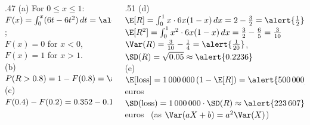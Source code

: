 \begin{slides}
	\small
	\exstatement
	\pause
	\begin{columns}[T]
		\begin{column}{.47\textwidth}
			\sol (a) For $0\le x\le1$:\\
			$F(x)=\int_0^x(6t-6t^2)\,dt=\alert{3x^2-2x^3}$;\\
			$F(x)=0$ for $x<0$, \ $F(x)=1$ for $x>1$.\\[1mm]
			\pause
			(b) $P(R>0.8)=1-F(0.8)=\alert{0.104}$\\[1mm]
			(c) $F(0.4)-F(0.2)=0.352-0.104=\alert{0.248}$
		\end{column}
		\begin{column}{.51\textwidth}
			\pause
			(d) $\E[R]=\int_0^1x\cdot6x(1-x)\,dx=2-\frac32=\alert{\frac12}$\\[1mm]
			$\E[R^2]=\int_0^1x^2\cdot6x(1-x)\,dx=\frac32-\frac65=\frac3{10}$\\[1mm]
			$\Var(R)=\frac3{10}-\frac14=\alert{\frac1{20}}$, \
			$\SD(R)=\sqrt{0.05}\approx\alert{0.2236}$\\[1mm]
			\pause
			(e) $\E[\text{loss}]=1\,000\,000\,(1-\E[R])=\alert{500\,000}$ euros\\[1mm]
			$\SD(\text{loss})=1\,000\,000\cdot\SD(R)\approx\alert{223\,607}$ euros
			\ (as $\Var(aX+b)=a^2\Var(X)$)
		\end{column}
	\end{columns}
\end{slides}

